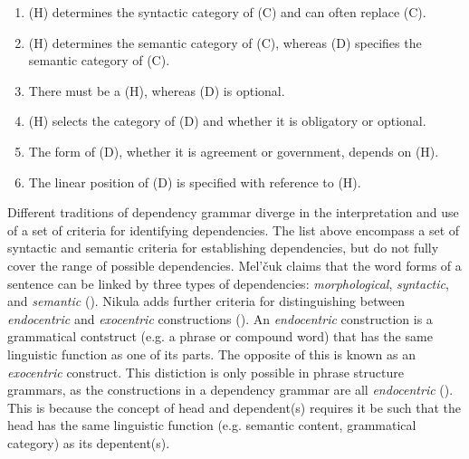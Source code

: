 \documentclass[10pt]{article}
\begin{document}
\begin{enumerate}
\item (H) determines the syntactic category of (C) and can often replace (C).
\item (H) determines the semantic category of (C), whereas (D) specifies the semantic category of (C).
\item There must be a (H), whereas (D) is optional.
\item (H) selects the category of (D) and whether it is obligatory or optional.
\item The form of (D), whether it is agreement or government, depends on (H).
\item The linear position of (D) is specified with reference to (H).
\end{enumerate}

Different traditions of dependency grammar diverge in the interpretation and use of a set of criteria for identifying dependencies. The list above encompass a set of syntactic and semantic criteria for establishing dependencies, but do not fully cover the range of possible dependencies. Mel'čuk claims that the word forms of a sentence can be linked by three types of dependencies: \textit{morphological}, \textit{syntactic}, and \textit{semantic} (\cite{melcuk}). Nikula adds further criteria for distinguishing between \textit{endocentric} and \textit{exocentric} constructions (\cite{nikula1986dependensgrammatik}). An \textit{endocentric} construction is a grammatical contstruct (e.g. a phrase or compound word) that has the same linguistic function as one of its parts. The opposite of this is known as an \textit{exocentric} construct. This distiction is only possible in phrase structure grammars, as the constructions in a dependency grammar are all \textit{endocentric} (\cite{endocentric-exocentric}). This is because the concept of head and dependent(s) requires it be such that the head has the same linguistic function (e.g. semantic content, grammatical category) as its depentent(s).

\end{document}
